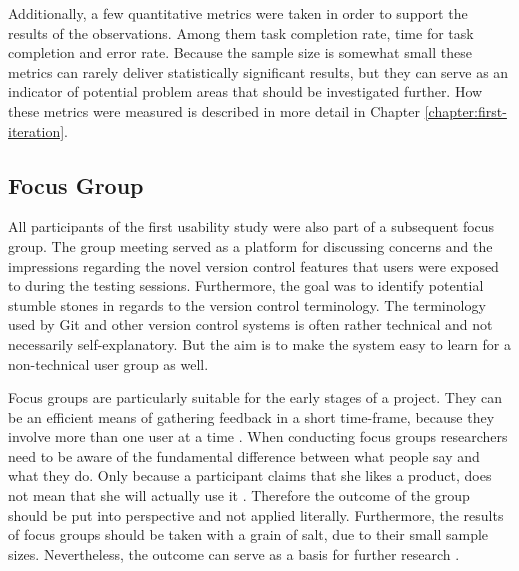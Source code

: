 Additionally, a few quantitative metrics were taken in order to support the results of the observations. Among them task completion rate, time for task completion and error rate. Because the sample size is somewhat small these metrics can rarely deliver statistically significant results, but they can serve as an indicator of potential problem areas that should be investigated further. How these metrics were measured is described in more detail in Chapter \ref{chapter:first-iteration}.








\subsection{Focus Group}
All participants of the first usability study were also part of a subsequent focus group. The group meeting served as a platform for discussing concerns and the impressions regarding the novel version control features that users were exposed to during the testing sessions. Furthermore, the goal was to identify potential stumble stones in regards to the version control terminology. The terminology used by Git and other version control systems is often rather technical and not necessarily self-explanatory. But the aim is to make the system easy to learn for a non-technical user group as well.

Focus groups are particularly suitable for the early stages of a project. They can be an efficient means of gathering feedback in a short time-frame, because they involve more than one user at a time \cite{rubin_handbook_2008} \cite{goodman_observing_2012}. When conducting focus groups researchers need to be aware of the fundamental difference between what people say and what they do. Only because a participant claims that she likes a product, does not mean that she will actually use it \cite{goodman_observing_2012}. Therefore the outcome of the group should be put into perspective and not applied literally. Furthermore, the results of focus groups should be taken with a grain of salt, due to their small sample sizes. Nevertheless, the outcome can serve as a basis for further research \cite{goodman_observing_2012}.


